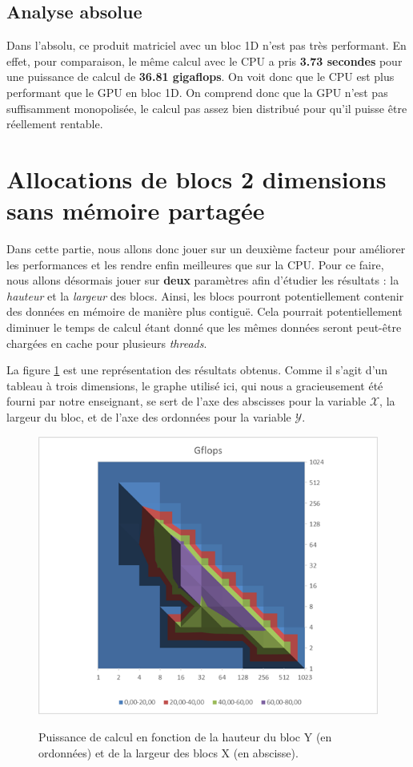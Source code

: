 \documentclass[	DIV=calc,%
							paper=a4,%
							fontsize=11pt%
							]{scrartcl}	 					%
\begin{document}
\subsection{Analyse absolue}
Dans l'absolu, ce produit matriciel avec un bloc 1D n'est pas très performant. En effet, pour comparaison, le même calcul avec le CPU a pris \textbf{3.73 secondes} pour une puissance de calcul de \textbf{36.81 gigaflops}. On voit donc que le CPU est plus performant que le GPU en bloc 1D. On comprend donc que la GPU n'est pas suffisamment monopolisée, le calcul pas assez bien distribué pour qu'il puisse être réellement rentable.

\section{Allocations de blocs 2 dimensions sans mémoire partagée}
Dans cette partie, nous allons donc jouer sur un deuxième facteur pour améliorer les performances et les rendre enfin meilleures que sur la CPU. Pour ce faire, nous allons désormais jouer sur \textbf{deux} paramètres afin d'étudier les résultats : la \textit{hauteur} et la \textit{largeur} des blocs. Ainsi, les blocs pourront potentiellement contenir des données en mémoire de manière plus contiguë. Cela pourrait potentiellement diminuer le temps de calcul étant donné que les mêmes données seront peut-être chargées en cache pour plusieurs \textit{threads}.\par
La figure \ref{img:2DK2_power} est une représentation des résultats obtenus. Comme il s'agit d'un tableau à trois dimensions, le graphe utilisé ici, qui nous a gracieusement été fourni par notre enseignant, se sert de l'axe des abscisses pour la variable $\mathcal{X}$, la largeur du bloc, et de l'axe des ordonnées pour la variable $\mathcal{Y}$.
\begin{figure}
      \includegraphics[keepaspectratio,width=12cm]{img/Gflops_depending_bloc_size.png}
      \label{img:2DK2_power}
	  \caption{Puissance de calcul en fonction de la hauteur du bloc Y (en ordonnées) et de la largeur des blocs X (en abscisse).}
\end{figure} 
\end{document}

